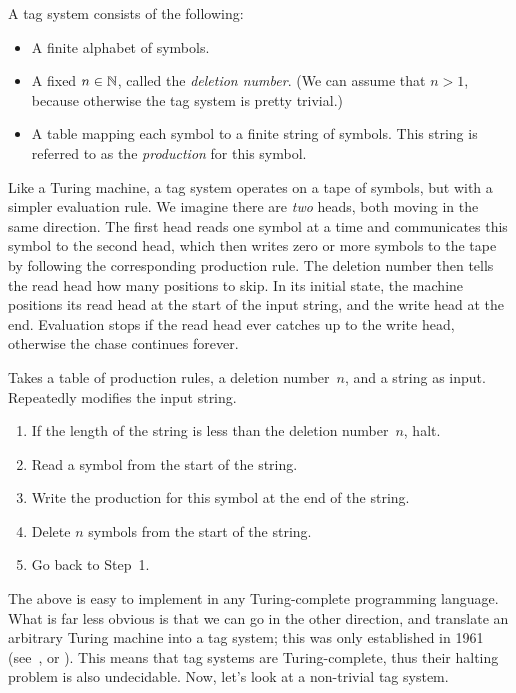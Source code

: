 \documentclass[../generics]{subfiles}
\begin{document}
\begin{definition}
A tag system consists of the following:
\begin{itemize}
\item A finite alphabet of symbols.
\item A fixed $n\in\mathbb{N}$, called the \emph{deletion number}. (We can assume that $n>1$, because otherwise the tag system is pretty trivial.)
\item A table mapping each symbol to a finite string of symbols. This string is referred to as the \emph{production} for this symbol.
\end{itemize}
\end{definition}
Like a Turing machine, a tag system operates on a tape of symbols, but with a simpler evaluation rule. We imagine there are \emph{two} heads, both moving in the same direction. The first head reads one symbol at a time and communicates this symbol to the second head, which then writes zero or more symbols to the tape by following the corresponding production rule. The deletion number then tells the read head how many positions to skip. In its initial state, the machine positions its read head at the start of the input string, and the write head at the end. Evaluation stops if the read head ever catches up to the write head, otherwise the chase continues forever.

\begin{algorithm}\label{tag system algo}
Takes a table of production rules, a deletion number~$n$, and a string as input. Repeatedly modifies the input string.
\begin{enumerate}
\item If the length of the string is less than the deletion number~$n$, halt.
\item Read a symbol from the start of the string.
\item Write the production for this symbol at the end of the string.
\item Delete $n$ symbols from the start of the string.
\item Go back to Step~1.
\end{enumerate}
\end{algorithm}
The above is easy to implement in any Turing-complete programming language. What is far less obvious is that we can go in the other direction, and translate an arbitrary Turing machine into a tag system; this was only established in 1961 (see~\cite{turingtag}, or \cite{minskymachines}). This means that tag systems are Turing-complete, thus their halting problem is also undecidable. Now, let's look at a non-trivial tag system.
\end{document}
